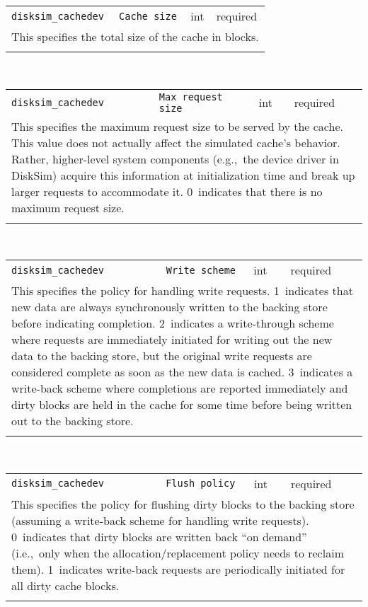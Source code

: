 \noindent 
\begin{tabular}{|p{1.5in}|p{3.5in}|p{0.5in}|p{0.5in}|}
\cline{1-4}
\texttt{disksim\_cachedev} & \texttt{Cache size} & int & required \\ 
\cline{1-4}
\multicolumn{4}{|p{6in}|}{
This specifies the total size of the cache in blocks.
}\\ 
\cline{1-4}
\multicolumn{4}{p{5in}}{}\\
\end{tabular}\\ 
\noindent 
\begin{tabular}{|p{1.5in}|p{3.5in}|p{0.5in}|p{0.5in}|}
\cline{1-4}
\texttt{disksim\_cachedev} & \texttt{Max request size} & int & required \\ 
\cline{1-4}
\multicolumn{4}{|p{6in}|}{
This specifies the maximum request size to be served by the cache. This
value does not actually affect the simulated cache's behavior.
Rather, higher-level system components (e.g.,~the device driver in
DiskSim) acquire this information at initialization time and break up
larger requests to accommodate it. 0~indicates that there is no
maximum request size.
}\\ 
\cline{1-4}
\multicolumn{4}{p{5in}}{}\\
\end{tabular}\\ 
\noindent 
\begin{tabular}{|p{1.5in}|p{3.5in}|p{0.5in}|p{0.5in}|}
\cline{1-4}
\texttt{disksim\_cachedev} & \texttt{Write scheme} & int & required \\ 
\cline{1-4}
\multicolumn{4}{|p{6in}|}{
This specifies the policy for handling write requests.
1~indicates that new data are always synchronously written to the
backing store before indicating completion.
2~indicates a write-through scheme where requests are immediately
initiated for writing out the new data to the backing store, but the
original write requests are considered complete as soon as the new
data is cached.
3~indicates a write-back scheme where completions are reported
immediately and dirty blocks are held in the cache for some time
before being written out to the backing store.
}\\ 
\cline{1-4}
\multicolumn{4}{p{5in}}{}\\
\end{tabular}\\ 
\noindent 
\begin{tabular}{|p{1.5in}|p{3.5in}|p{0.5in}|p{0.5in}|}
\cline{1-4}
\texttt{disksim\_cachedev} & \texttt{Flush policy} & int & required \\ 
\cline{1-4}
\multicolumn{4}{|p{6in}|}{
This specifies the policy for flushing dirty blocks to the backing store
(assuming a write-back scheme for handling write requests).
0~indicates that dirty blocks are written back ``on demand''
(i.e.,~only when the allocation/replacement policy needs to reclaim
them).
1~indicates write-back requests are periodically initiated for all
dirty cache blocks.
}\\ 
\cline{1-4}
\multicolumn{4}{p{5in}}{}\\
\end{tabular}\\ 
